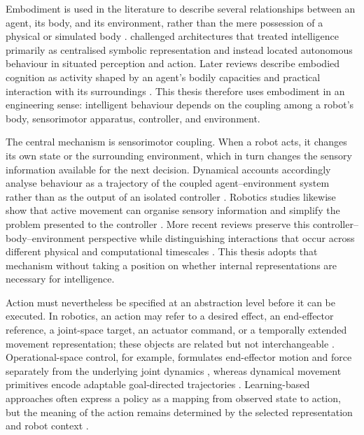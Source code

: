 Embodiment is used in the literature to describe several relationships between
an agent, its body, and its environment, rather than the mere possession of a
physical or simulated body \citep{ziemke2003embodiment}.
\citet{brooks1991intelligence} challenged architectures that treated
intelligence primarily as centralised symbolic representation and instead
located autonomous behaviour in situated perception and action. Later reviews
describe embodied cognition as activity shaped by an agent's bodily capacities
and practical interaction with its surroundings
\citep{anderson2003fieldguide}. This thesis therefore uses embodiment in an
engineering sense: intelligent behaviour depends on the coupling among a
robot's body, sensorimotor apparatus, controller, and environment.

The central mechanism is sensorimotor coupling. When a robot acts, it changes
its own state or the surrounding environment, which in turn changes the sensory
information available for the next decision. Dynamical accounts accordingly
analyse behaviour as a trajectory of the coupled agent--environment system
rather than as the output of an isolated controller
\citep{beer1995dynamical}. Robotics studies likewise show that active movement
can organise sensory information and simplify the problem presented to the
controller \citep{pfeifer1997sensorymotor}. More recent reviews preserve this
controller--body--environment perspective while distinguishing interactions
that occur across different physical and computational timescales
\citep{iida2023timescales}. This thesis adopts that mechanism without taking a
position on whether internal representations are necessary for intelligence.

Action must nevertheless be specified at an abstraction level before it can be
executed. In robotics, an action may refer to a desired effect, an end-effector
reference, a joint-space target, an actuator command, or a temporally extended
movement representation; these objects are related but not interchangeable
\citep{zech2019action}. Operational-space control, for example, formulates
end-effector motion and force separately from the underlying joint dynamics
\citep{khatib1987unified}, whereas dynamical movement primitives encode
adaptable goal-directed trajectories \citep{ijspeert2013dmp}. Learning-based
approaches often express a policy as a mapping from observed state to action,
but the meaning of the action remains determined by the selected representation
and robot context \citep{argall2009survey,kober2013reinforcement}.


